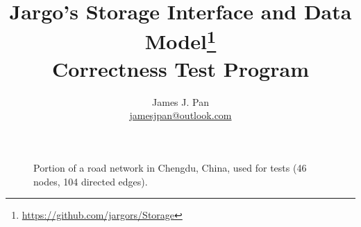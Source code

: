 \documentclass{article}
\title{Jargo's Storage Interface
  and Data Model\footnote{\url{https://github.com/jargors/Storage}}\\
  \vspace{.5em}
  \Large{\textbf{Correctness Test Program}}}
\author{James J. Pan\\
  \small{\href{mailto:jamesjpan@outlook.com}{jamesjpan@outlook.com}}
}
\theoremstyle{definition}
\begin{document}
\maketitle
\pagestyle{noweb}

\begin{figure}[h]
\centering
{}
\caption{Portion of a road network in Chengdu, China,
    used for tests (46 nodes, 104 directed edges).}
\label{fig:road-network}
\end{figure}
\newpage

\tableofcontents
\end{document}
